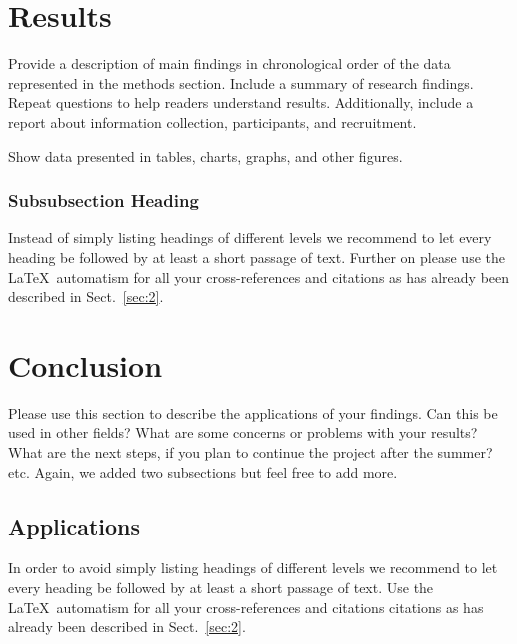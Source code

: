 \documentclass[graybox]{svmult}
\begin{document}
\section{Results}
\label{sec:4}
Provide a description of main findings in chronological order of the data represented in the methods section. Include a summary of research findings. Repeat questions to help readers understand results. Additionally, include a report about information collection, participants, and recruitment.

Show data presented in tables, charts, graphs, and other figures.
 
\subsubsection{Subsubsection Heading}
Instead of simply listing headings of different levels we recommend to let every heading be followed by at least a short passage of text.  Further on please use the \LaTeX\ automatism for all your cross-references and citations as has already been described in Sect.~\ref{sec:2}.

\section{Conclusion}
\label{sec:5}
Please use this section to describe the applications of your findings. Can this be used in other fields? What are some concerns or problems with your results? What are the next steps, if you plan to continue the project after the summer? etc. Again, we added two subsections but feel free to add more.

\subsection{Applications} %
In order to avoid simply listing headings of different levels we recommend to let every heading be followed by at least a short passage of text. Use the \LaTeX\ automatism for all your cross-references and citations citations as has already been described in Sect.~\ref{sec:2}.
\end{document}
